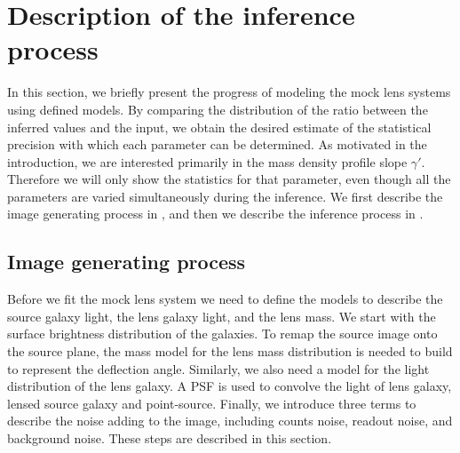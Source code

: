 \documentclass[a4paper,11pt]{article}
\begin{document}


\section{Description of the inference process}


In this section, we briefly present the progress of modeling the mock
lens systems using defined models. By comparing the distribution of
the ratio between the inferred values and the input, we obtain the
desired estimate of the statistical precision with which each
parameter can be determined. As motivated in the introduction, we are
interested primarily in the mass density profile slope
$\gamma'$. Therefore we will only show the statistics for that
parameter, even though all the parameters are varied simultaneously
during the inference. We first describe the image generating process
in , and then we describe the inference process in
.

\subsection{Image generating process}
\label{ssec:image}

Before we fit the mock lens system we need to define the models to
describe the source galaxy light, the lens galaxy light, and the lens
mass. We start with the surface brightness distribution of the
galaxies. To remap the source image onto the source plane, the mass
model for the lens mass distribution is needed to build to represent
the deflection angle. Similarly, we also need a model for the light
distribution of the lens galaxy. A PSF is used to convolve the light
of lens galaxy, lensed source galaxy and point-source. Finally, we
introduce three terms to describe the noise adding to the image,
including counts noise, readout noise, and background noise. These
steps are described in this section.
\end{document}

